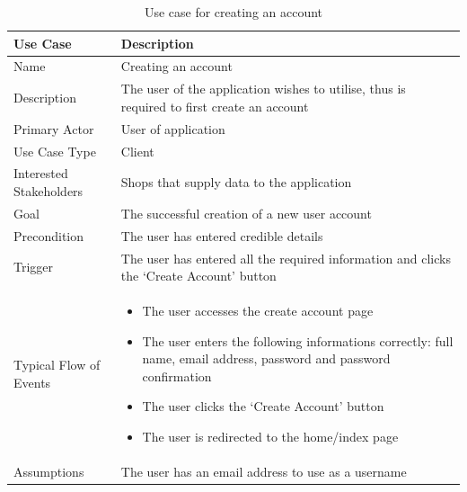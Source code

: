 \documentclass[10pt,twocolumn]{witseiepaper}
\begin{document}
		\begin{table}[htbp]
			\centering
			\caption{Use case for creating an account}
			\label{uc:create_account}
			\begin{tabular}{|p{}|p{}|}
				\hline
				\textbf{Use Case} & \textbf{Description} \\ \hline
				Name &  Creating an account \\ \hline
				Description & The user of the application wishes to utilise, thus is required to first create an account \\ \hline
				Primary Actor & User of application \\ \hline
				Use Case Type & Client \\ \hline
				Interested Stakeholders & Shops that supply data to the application \\ \hline
				Goal & The successful creation of a new user account \\ \hline
				Precondition & The user has entered credible details \\ \hline
				Trigger & The user has entered all the required information and clicks the `Create Account' button \\ \hline
				Typical Flow of Events & 
				\begin{itemize}
					\item The user accesses the create account page
					\item The user enters the following informations correctly: full name, email address, password and password confirmation
					\item The user clicks the `Create Account' button
					\item The user is redirected to the home/index page
				\end{itemize}
				 \\ \hline
				Assumptions & The user has an email address to use as a username \\
				\hline
			\end{tabular}
		\end{table}
		
\end{document}
